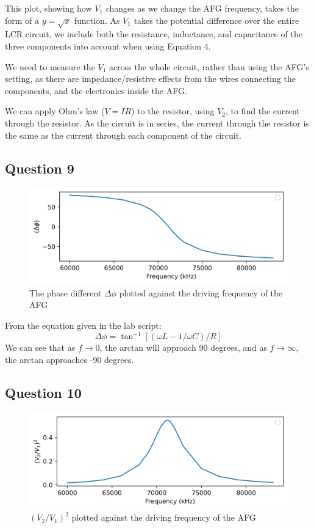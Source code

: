 \documentclass[a4paper]{article}
\begin{document}
This plot, showing how $V_1$ changes as we change the AFG frequency, takes the form of a $y=\sqrt x$ function. As $V_1$ takes the potential difference over the entire LCR circuit, we include both the resistance, inductance, and capacitance of the three components into account when using Equation 4.

We need to measure the $V_1$ across the whole circuit, rather than using the AFG's setting, as there are impedance/resistive effects from the wires connecting the components, and the electronics inside the AFG.

We can apply Ohm's law ($V=IR$) to the resistor, using $V_2$, to find the current through the resistor. As the circuit is in series, the current through the resistor is the same as the current through each component of the circuit.

\subsection{Question 9}
\begin{figure}[h]
\includegraphics[scale=0.8]{phase.png}
\caption{The phase different $\Delta\phi$ plotted against the driving frequency of the AFG}
\end{figure}

From the equation given in the lab script:
\begin{equation}
\Delta\phi=\tan^{-1}[(\omega L-1/\omega C)/R]
\end{equation}
We can see that as $f\rightarrow0$, the arctan will approach 90 degrees, and as $f\rightarrow\infty$, the arctan approaches -90 degrees.

\subsection{Question 10}
\begin{figure}[h]
\includegraphics[scale=0.8]{qfac.png}
\caption{$(V_2/V_1)^2$ plotted against the driving frequency of the AFG}
\end{figure}
\end{document}
